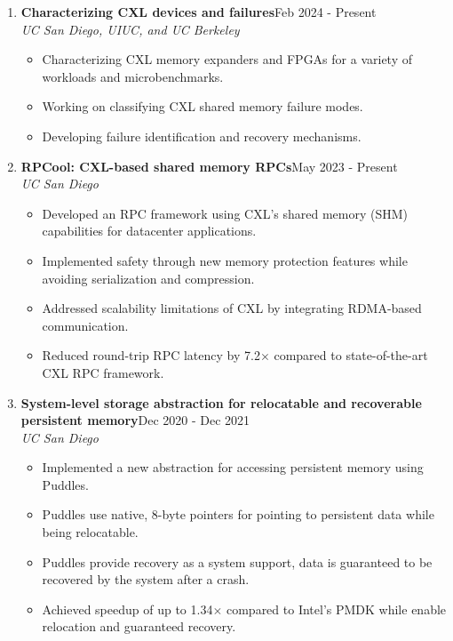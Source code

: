\documentclass{article}
\newlength{\projitemsep}
\begin{document}
\begin{enumerate}
        \item \textbf{Characterizing CXL devices and failures}\hfill{}Feb 2024 - Present\\
    \textit{UC San Diego, UIUC, and UC Berkeley}\vspace{-0.15cm}
    \begin{itemize}[itemsep=\projitemsep]
            \item Characterizing CXL memory expanders and FPGAs for a variety of workloads and microbenchmarks.
            \item Working on classifying CXL shared memory failure modes.
            \item Developing failure identification and recovery mechanisms.
    \end{itemize}
        \item \textbf{RPCool: CXL-based shared memory RPCs}\hfill{}May 2023 - Present\\
    \textit{UC San Diego}\vspace{-0.15cm}
    \begin{itemize}[itemsep=\projitemsep]
            \item Developed an RPC framework using CXL's shared memory (SHM) capabilities for datacenter applications.
            \item Implemented safety through new memory protection features while avoiding serialization and compression.
            \item Addressed scalability limitations of CXL by integrating RDMA-based communication. 
            \item Reduced round-trip RPC latency by 7.2$\times$ compared to state-of-the-art CXL RPC framework.
      \end{itemize}
    \item \textbf{System-level storage abstraction for relocatable and recoverable persistent memory}\hfill{}Dec 2020 - Dec 2021\\
      \textit{UC San Diego}\vspace{-0.15cm}
    \begin{itemize}[itemsep=\projitemsep]
            \item Implemented a new abstraction for accessing persistent memory using Puddles.
            \item Puddles use native, 8-byte pointers for pointing to persistent data while being relocatable.
            \item Puddles provide recovery as a system support, data is guaranteed to be recovered by the system after a crash.
            \item Achieved speedup of up to 1.34$\times$ compared to Intel's PMDK while enable relocation and guaranteed recovery.
    \end{itemize}


\end{enumerate}
\end{document}
